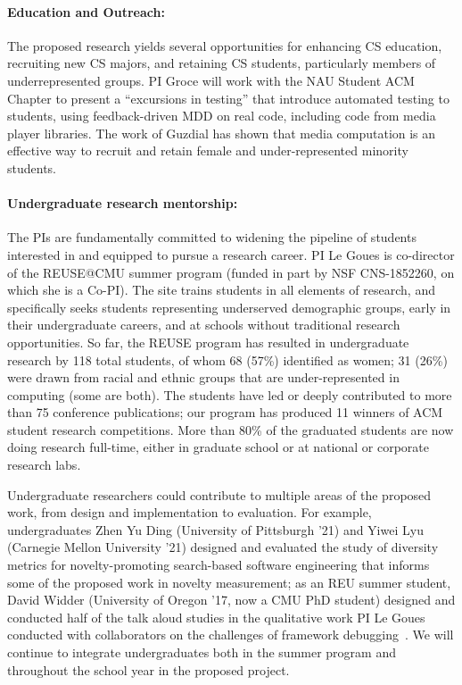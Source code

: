 \paragraph{Education and Outreach:}
The proposed research yields several opportunities for enhancing CS
education, recruiting new CS majors, and retaining CS students,
particularly members of underrepresented groups.  
PI Groce will work with the NAU Student ACM Chapter to present a
``excursions in testing'' that introduce automated testing
to students, using feedback-driven MDD on real code, including code from
media player libraries.  The work of Guzdial
\cite{Guzdial} has shown that media computation is an
effective way to recruit and retain female and
under-represented minority students.

\paragraph{Undergraduate research mentorship:} 
The PIs are fundamentally committed to widening the pipeline of students
interested in and equipped to pursue a research career. PI Le Goues is
co-director of the REUSE@CMU summer program (funded in part by NSF CNS-1852260,
on which she is a Co-PI). The site trains students in
all elements of research, and specifically seeks students representing
underserved demographic groups, early in their undergraduate careers, and at
schools without traditional research opportunities.  So far, the REUSE program
has resulted in undergraduate research by 118 total students, of whom 68 (57\%)
identified as women; 31 (26\%) were drawn from racial and ethnic groups that are
under-represented in computing (some are both).  The students have led or deeply contributed to more than 75 conference publications; our program has produced 11 winners of ACM student research competitions. More than 80\% of the graduated
students are now doing research full-time, either in graduate school or at
national or corporate research labs.

Undergraduate researchers could contribute to multiple areas of the proposed
work, from design and implementation to evaluation. For example, undergraduates
Zhen Yu Ding (University of Pittsburgh '21) and Yiwei Lyu (Carnegie Mellon
University '21) designed and evaluated the study of diversity metrics for
novelty-promoting search-based software engineering that informs some of the
proposed work in novelty measurement; as an REU summer student, David Widder
(University of Oregon '17, now a CMU PhD student) designed and conducted half of
the talk aloud studies in the qualitative work PI Le Goues conducted with
collaborators on the challenges of framework
debugging~\cite{frameworkDebugging}.  We will continue to integrate
undergraduates both in the summer program and throughout the school year in the
proposed project.
